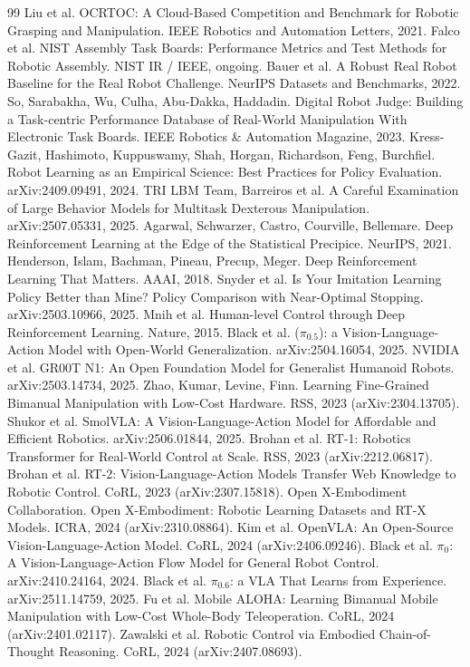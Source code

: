 \documentclass{article}
\begin{document}
\begin{thebibliography}{99}
 Liu et al. OCRTOC: A Cloud-Based Competition and Benchmark for Robotic Grasping and Manipulation. IEEE Robotics and Automation Letters, 2021.
 Falco et al. NIST Assembly Task Boards: Performance Metrics and Test Methods for Robotic Assembly. NIST IR / IEEE, ongoing.
 Bauer et al. A Robust Real Robot Baseline for the Real Robot Challenge. NeurIPS Datasets and Benchmarks, 2022.
 So, Sarabakha, Wu, Culha, Abu-Dakka, Haddadin. Digital Robot Judge: Building a Task-centric Performance Database of Real-World Manipulation With Electronic Task Boards. IEEE Robotics \& Automation Magazine, 2023.
 Kress-Gazit, Hashimoto, Kuppuswamy, Shah, Horgan, Richardson, Feng, Burchfiel. Robot Learning as an Empirical Science: Best Practices for Policy Evaluation. arXiv:2409.09491, 2024.
 TRI LBM Team, Barreiros et al. A Careful Examination of Large Behavior Models for Multitask Dexterous Manipulation. arXiv:2507.05331, 2025.
 Agarwal, Schwarzer, Castro, Courville, Bellemare. Deep Reinforcement Learning at the Edge of the Statistical Precipice. NeurIPS, 2021.
 Henderson, Islam, Bachman, Pineau, Precup, Meger. Deep Reinforcement Learning That Matters. AAAI, 2018.
 Snyder et al. Is Your Imitation Learning Policy Better than Mine? Policy Comparison with Near-Optimal Stopping. arXiv:2503.10966, 2025.
 Mnih et al. Human-level Control through Deep Reinforcement Learning. Nature, 2015.
 Black et al. ($\pi_{0.5}$): a Vision-Language-Action Model with Open-World Generalization. arXiv:2504.16054, 2025.
 NVIDIA et al. GR00T N1: An Open Foundation Model for Generalist Humanoid Robots. arXiv:2503.14734, 2025.
 Zhao, Kumar, Levine, Finn. Learning Fine-Grained Bimanual Manipulation with Low-Cost Hardware. RSS, 2023 (arXiv:2304.13705).
 Shukor et al. SmolVLA: A Vision-Language-Action Model for Affordable and Efficient Robotics. arXiv:2506.01844, 2025.
 Brohan et al. RT-1: Robotics Transformer for Real-World Control at Scale. RSS, 2023 (arXiv:2212.06817).
 Brohan et al. RT-2: Vision-Language-Action Models Transfer Web Knowledge to Robotic Control. CoRL, 2023 (arXiv:2307.15818).
 Open X-Embodiment Collaboration. Open X-Embodiment: Robotic Learning Datasets and RT-X Models. ICRA, 2024 (arXiv:2310.08864).
 Kim et al. OpenVLA: An Open-Source Vision-Language-Action Model. CoRL, 2024 (arXiv:2406.09246).
 Black et al. $\pi_{0}$: A Vision-Language-Action Flow Model for General Robot Control. arXiv:2410.24164, 2024.
 Black et al. $\pi_{0.6}$: a VLA That Learns from Experience. arXiv:2511.14759, 2025.
 Fu et al. Mobile ALOHA: Learning Bimanual Mobile Manipulation with Low-Cost Whole-Body Teleoperation. CoRL, 2024 (arXiv:2401.02117).
 Zawalski et al. Robotic Control via Embodied Chain-of-Thought Reasoning. CoRL, 2024 (arXiv:2407.08693).
\end{thebibliography}
\end{document}
